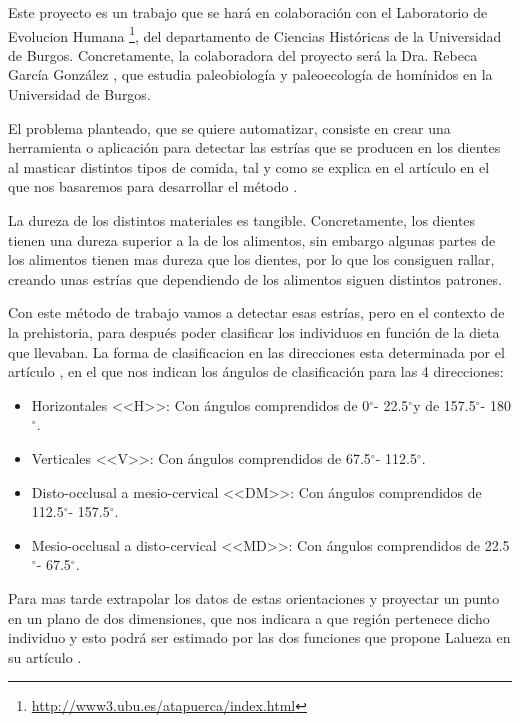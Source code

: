 \newcommand{\grad}{$^{\circ}$}
Este proyecto es un trabajo que se hará en colaboración con el Laboratorio de Evolucion Humana \footnote{ \url{http://www3.ubu.es/atapuerca/index.html}}, del departamento de Ciencias Históricas de la Universidad de Burgos. Concretamente, la colaboradora del proyecto será la Dra. Rebeca García González \cite{ubu:Rebe},  que estudia paleobiología y paleoecología de homínidos en la Universidad de Burgos. 

El problema planteado, que se quiere automatizar, consiste en crear una herramienta o aplicación para detectar las estrías que se producen en los dientes al masticar distintos tipos de comida, tal y como se explica en el artículo en el que nos basaremos para desarrollar el método \cite{garcia2015dietary}.

La dureza de los distintos materiales es tangible. Concretamente, los dientes tienen una dureza superior a la de los alimentos, sin embargo algunas partes de los alimentos tienen mas dureza que los dientes, por lo que los consiguen rallar, creando unas estrías que dependiendo de los alimentos siguen distintos patrones.

 
Con este método de trabajo vamos a detectar esas estrías, pero en el contexto de la prehistoria, para después poder clasificar los individuos en función de la dieta que llevaban. La forma de clasificacion en las direcciones esta determinada por el artículo \cite{garcia2015dietary}, en el que nos indican los ángulos de clasificación para las 4 direcciones:
\begin{itemize}
\item Horizontales <<H>>: Con ángulos comprendidos de 0\grad - 22.5\grad y de 157.5\grad - 180\grad.
\item Verticales <<V>>: Con ángulos comprendidos de 67.5\grad - 112.5\grad. 
\item Disto-occlusal a mesio-cervical <<DM>>: Con ángulos comprendidos de 112.5\grad - 157.5\grad.
\item Mesio-occlusal a disto-cervical <<MD>>: Con ángulos comprendidos de 22.5\grad - 67.5\grad.
\end{itemize}
Para mas tarde extrapolar los datos de estas orientaciones y proyectar un punto en un plano de dos dimensiones, que nos indicara a que región pertenece dicho individuo y esto podrá ser estimado por las dos funciones que propone Lalueza en su artículo \cite{Lalueza:perez}. 


